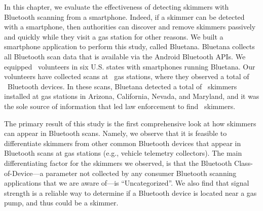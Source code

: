
In this chapter, we evaluate the effectiveness of detecting skimmers with 
Bluetooth scanning from a smartphone.
%
Indeed, if a skimmer can be detected with 
a smartphone, then authorities can discover and remove
skimmers passively and quickly while they visit a gas station for
other reasons.
% 
We built a smartphone application to perform this study, called Bluetana.
%
Bluetana collects all Bluetooth scan data that is available via
the Android Bluetooth APIs.
%
We equipped \numvolunteers~volunteers in six U.S. states with smartphones
running Bluetana. 
%
Our volunteers have collected scans at \visitedgasstations~gas stations, where
%
they observed a total of \totalbtobserved~Bluetooth devices.
%
In these scans, Bluetana detected a total of \totalskimmers~skimmers
installed at gas stations in Arizona, California, Nevada, and Maryland, and it
%
was the sole source of information
that led law enforcement to find \totalskimmersBluetana~skimmers.
%
%
%

%
%
%



The primary result of this study is the first comprehensive look at how 
skimmers can appear in Bluetooth scans.
%
Namely, we observe that it is feasible to differentiate skimmers from other
common Bluetooth devices that appear in Bluetooth scans at gas stations (e.g.,
vehicle telemetry collectors).
%
The main differentiating factor for the skimmers we observed, is that the
Bluetooth Class-of-Device---a parameter not collected by any consumer Bluetooth
scanning applications that we are aware of---is ``Uncategorized''.
%
We also find that signal strength is a reliable way to determine if a Bluetooth
device is located near a gas pump, and thus could be a skimmer.
%
%

